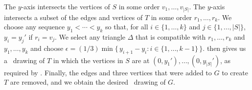 The $y$-axis intersects the vertices of $S$ in some order $v_1,\ldots,v_{|S|}$.  The $y$-axis intersects a subset of the edges
and vertices of $T$ in some order $r_1,\ldots,r_k$.  We choose any
sequence $y_1<\cdots<y_k$ so that, for all $i\in\{1,\ldots,k\}$ and
$j\in\{1,\ldots,|S|\}$, $y_i = y_j'$ if $r_i=v_j$.  We select
any triangle $\Delta$ that is compatible with $r_1,\ldots,r_k$ and
$y_1,\ldots,y_k$ and choose $\epsilon = (1/3)\min\{\,y_{i+1}-y_{i}:
i\in\{1,\ldots,k-1\}\,\}$.   then gives us a \Fary\
drawing of $T$ in which the vertices in $S$ are at
$(0,y_1'),\ldots,(0,y_{|S|}')$, as required by
.
Finally, the edges and three vertices that were added to $G$ to create $T$ are  removed, and we obtain the desired \Fary\ drawing of $G$.



